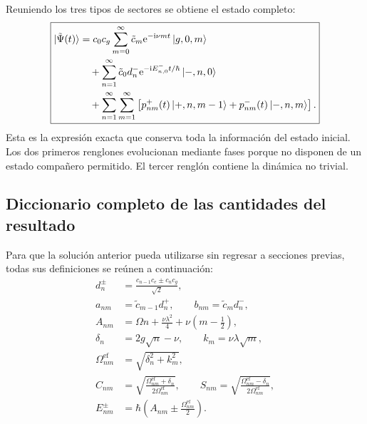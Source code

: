 \documentclass[11pt]{article}
\newcommand{\ii}{\mathrm{i}}
\newcommand{\ee}{\mathrm{e}}
\begin{document}
Reuniendo los tres tipos de sectores se obtiene el estado completo:
\begin{equation}
  \boxed{
  \begin{aligned}
  \ket{\tilde\Psi(t)}
  &=
  c_0c_g
  \sum_{m=0}^{\infty}
  \tilde c_m
  \ee^{-\ii\nu mt}
  \ket{g,0,m}
  \\
  &\quad+
  \sum_{n=1}^{\infty}
  \tilde c_0d_n^-
  \ee^{-\ii E_{n,0}^{-}t/\hbar}
  \ket{-,n,0}
  \\
  &\quad+
  \sum_{n=1}^{\infty}\sum_{m=1}^{\infty}
  \left[
  p_{nm}^{+}(t)\ket{+,n,m-1}
  +
  p_{nm}^{-}(t)\ket{-,n,m}
  \right].
  \end{aligned}
  }
\end{equation}
Esta es la expresi\'on exacta que conserva toda la informaci\'on del estado
inicial. Los dos primeros renglones evolucionan mediante fases porque no
disponen de un estado compa\~nero permitido. El tercer rengl\'on contiene la
din\'amica no trivial.

\subsection{Diccionario completo de las cantidades del resultado}

Para que la soluci\'on anterior pueda utilizarse sin regresar a secciones
previas, todas sus definiciones se re\'unen a continuaci\'on:
\begin{equation}
  \boxed{
  \begin{aligned}
  d_n^\pm
  &=
  \frac{c_{n-1}c_e\pm c_nc_g}{\sqrt2},
  \\
  a_{nm}
  &=
  \tilde c_{m-1}d_n^+,
  \qquad
  b_{nm}
  =
  \tilde c_md_n^-,
  \\
  A_{nm}
  &=
  \Omega n+\frac{\nu\lambda^2}{4}
  +
  \nu\left(m-\frac12\right),
  \\
  \delta_n
  &=
  2g\sqrt n-\nu,
  \qquad
  k_m
  =
  \nu\lambda\sqrt m,
  \\
  \Omega_{nm}^{\mathrm{ef}}
  &=
  \sqrt{\delta_n^2+k_m^2},
  \\
  C_{nm}
  &=
  \sqrt{
  \frac{\Omega_{nm}^{\mathrm{ef}}+\delta_n}
  {2\Omega_{nm}^{\mathrm{ef}}}
  },
  \qquad
  S_{nm}
  =
  \sqrt{
  \frac{\Omega_{nm}^{\mathrm{ef}}-\delta_n}
  {2\Omega_{nm}^{\mathrm{ef}}}
  },
  \\
  E_{nm}^{\pm}
  &=
  \hbar
  \left(
  A_{nm}\pm\frac{\Omega_{nm}^{\mathrm{ef}}}{2}
  \right).
  \end{aligned}
  }
\end{equation}
\end{document}

